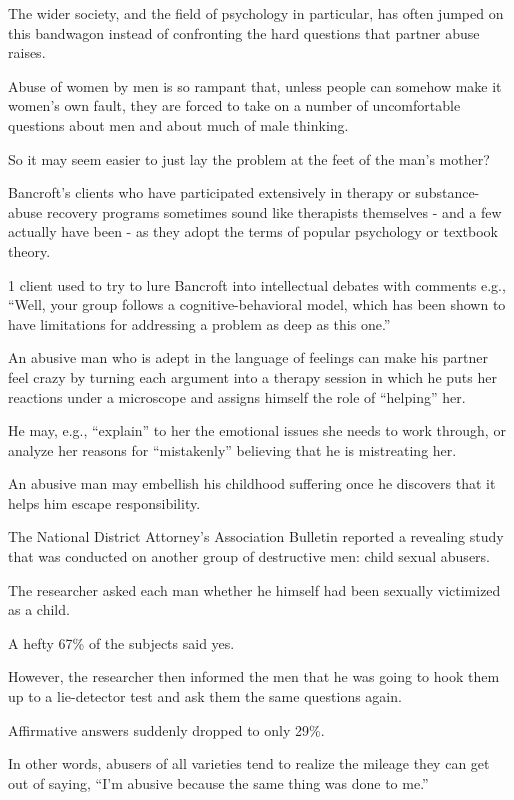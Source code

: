 \documentclass[oneside]{article}
\numberwithin{equation}{section}
\begin{document}
The wider society, and the field of psychology in particular, has often jumped on this bandwagon instead of confronting the hard questions that partner abuse raises.

Abuse of women by men is so rampant that, unless people can somehow make it women's own fault, they are forced to take on a number of uncomfortable questions about men and about much of male thinking.

So it may seem easier to just lay the problem at the feet of the man's mother?

%
Bancroft's clients who have participated extensively in therapy or substance-abuse recovery programs sometimes sound like therapists themselves - and a few actually have been - as they adopt the terms of popular psychology or textbook theory.

1 client used to try to lure Bancroft into intellectual debates with comments e.g., ``Well, your group follows a cognitive-behavioral model, which has been shown to have limitations for addressing a problem as deep as this one.''

An abusive man who is adept in the language of feelings can make his partner feel crazy by turning each argument into a therapy session in which he puts her reactions under a microscope and assigns himself the role of ``helping'' her.

He may, e.g., ``explain'' to her the emotional issues she needs to work through, or analyze her reasons for ``mistakenly'' believing that he is mistreating her.

%
An abusive man may embellish his childhood suffering once he discovers that it helps him escape responsibility.

The National District Attorney's  Association Bulletin reported a revealing study that was conducted on another group of destructive men: child sexual abusers.

The researcher asked each man whether he himself had been sexually victimized as a child.

A hefty 67\% of the subjects said yes.

However, the researcher then informed the men that he was going to hook them up to a lie-detector test and ask them the same questions again.

Affirmative answers suddenly dropped to only 29\%.

In other words, abusers of all varieties tend to realize the mileage they can get out of saying, ``I'm abusive because the same thing was done to me.''
\end{document}
